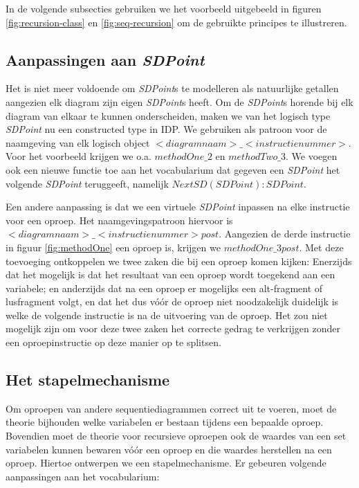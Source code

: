In de volgende subsecties gebruiken we het voorbeeld uitgebeeld in figuren \ref{fig:recursion-class} en \ref{fig:seq-recursion} om de gebruikte principes te illustreren.

\subsection{Aanpassingen aan \textit{SDPoint}}
Het is niet meer voldoende om \textit{SDPoint}s te modelleren als natuurlijke getallen aangezien elk diagram zijn eigen \textit{SDPoint}s heeft. Om de \textit{SDPoint}s horende bij elk diagram van elkaar te kunnen onderscheiden, maken we van het logisch type \textit{SDPoint} nu een constructed type in IDP. We gebruiken als patroon voor de naamgeving van elk logisch object $<diagramnaam>\_<instructienummer>$. Voor het voorbeeld krijgen we o.a. $methodOne\_2$ en $methodTwo\_3$. We voegen ook een nieuwe functie toe aan het vocabularium dat gegeven een \textit{SDPoint} het volgende \textit{SDPoint} teruggeeft, namelijk $NextSD(SDPoint) : SDPoint$.

Een andere aanpassing is dat we een virtuele \textit{SDPoint} inpassen na elke instructie voor een oproep. Het naamgevingspatroon hiervoor is $<diagramnaam>\_<instructienummer>post$. Aangezien de derde instructie in figuur \ref{fig:methodOne} een oproep is, krijgen we $methodOne\_3post$. Met deze toevoeging ontkoppelen we twee zaken die bij een oproep komen kijken: Enerzijds dat het mogelijk is dat het resultaat van een oproep wordt toegekend aan een variabele; en anderzijds dat na een oproep er mogelijks een alt-fragment of lusfragment volgt, en dat het dus v\'o\'or de oproep niet noodzakelijk duidelijk is welke de volgende instructie is na de uitvoering van de oproep. Het zou niet mogelijk zijn om voor deze twee zaken het correcte gedrag te verkrijgen zonder een oproepinstructie op deze manier op te splitsen.

\subsection{Het stapelmechanisme}
Om oproepen van andere sequentiediagrammen correct uit te voeren, moet de theorie bijhouden welke variabelen er bestaan tijdens een bepaalde oproep. Bovendien moet de theorie voor recursieve oproepen ook de waardes van een set variabelen kunnen bewaren v\'o\'or een oproep en die waardes herstellen na een oproep. Hiertoe ontwerpen we een stapelmechanisme. Er gebeuren volgende aanpassingen aan het vocabularium:

